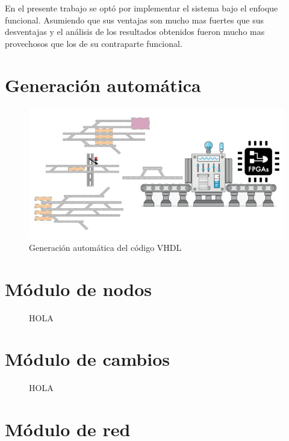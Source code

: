 En el presente trabajo se optó por implementar el sistema bajo el enfoque funcional. Asumiendo que sus ventajas son mucho mas fuertes que sus desventajas y el análisis de los resultados obtenidos fueron mucho mas provechosos que los de su contraparte funcional.

\section{Generación automática}

	\begin{figure}[h]
	\centering
		\includegraphics[scale=.3]{./Figures/Generacion}
		\caption{Generación automática del código VHDL}
		\label{fig:hola}
	\end{figure}

\section{Módulo de nodos}

	\begin{figure}[h]
	\centering
		\caption{HOLA}
		\label{fig:hola}
	\end{figure}
	
\section{Módulo de cambios}

	\begin{figure}[h]
	\centering
		\caption{HOLA}
		\label{fig:hola}
	\end{figure}
	
\section{Módulo de red}

